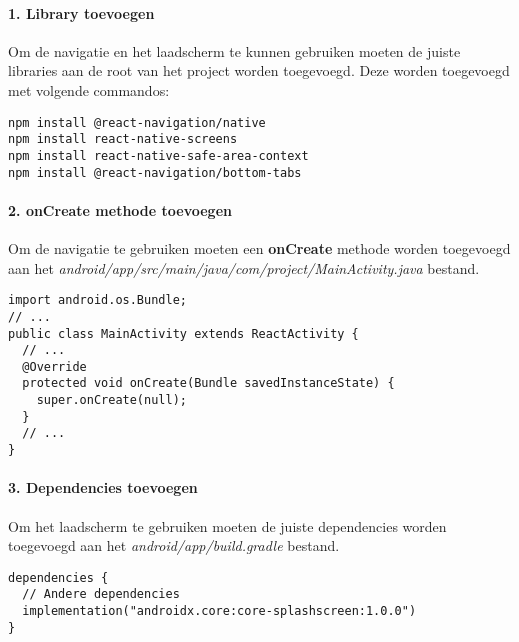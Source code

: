 \paragraph{1. Library toevoegen}
Om de navigatie en het laadscherm te kunnen gebruiken moeten de juiste libraries aan 
de root van het project worden toegevoegd. Deze worden toegevoegd met volgende commandos:
\begin{verbatim}
npm install @react-navigation/native
npm install react-native-screens
npm install react-native-safe-area-context
npm install @react-navigation/bottom-tabs
\end{verbatim}

\paragraph{2. onCreate methode toevoegen}
Om de navigatie te gebruiken moeten een \textbf{onCreate} methode worden toegevoegd aan het
\textit{android/app/src/main/java/com/project/MainActivity.java} bestand.
\begin{verbatim}
import android.os.Bundle;
// ...
public class MainActivity extends ReactActivity {
  // ...
  @Override
  protected void onCreate(Bundle savedInstanceState) {
    super.onCreate(null);
  }
  // ...
}
\end{verbatim}

\paragraph{3. Dependencies toevoegen}
Om het laadscherm te gebruiken moeten de juiste dependencies worden toegevoegd aan het
\textit{android/app/build.gradle} bestand.
\begin{verbatim}
dependencies {
  // Andere dependencies
  implementation("androidx.core:core-splashscreen:1.0.0")
}
\end{verbatim}

